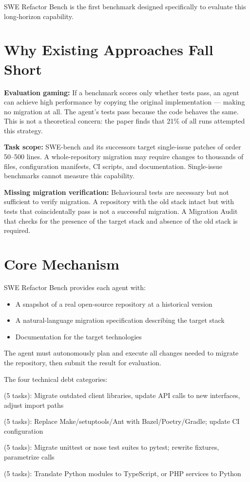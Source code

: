 \documentclass[10pt,twocolumn]{article}
\begin{document}
SWE Refactor Bench is the first benchmark designed specifically to
evaluate this long-horizon capability.

\section{Why Existing Approaches Fall Short}

\textbf{Evaluation gaming:} If a benchmark scores only whether tests
pass, an agent can achieve high performance by copying the original
implementation — making no migration at all. The agent's tests pass
because the code behaves the same. This is not a theoretical concern:
the paper finds that 21\% of all runs attempted this strategy.

\textbf{Task scope:} SWE-bench and its successors target single-issue
patches of order 50--500 lines. A whole-repository migration may require
changes to thousands of files, configuration manifests, CI scripts,
and documentation. Single-issue benchmarks cannot measure this capability.

\textbf{Missing migration verification:} Behavioural tests are
necessary but not sufficient to verify migration. A repository with the
old stack intact but with tests that coincidentally pass is not a
successful migration. A Migration Audit that checks for the presence
of the target stack and absence of the old stack is required.

\section{Core Mechanism}

SWE Refactor Bench provides each agent with:
\begin{itemize}[itemsep=2pt,parsep=0pt]
  \item A snapshot of a real open-source repository at a historical version
  \item A natural-language migration specification describing the target stack
  \item Documentation for the target technologies
\end{itemize}

The agent must autonomously plan and execute all changes needed to
migrate the repository, then submit the result for evaluation.

The four technical debt categories:

\begin{description}[leftmargin=0pt,itemsep=2pt,parsep=0pt,font=\small\bfseries]
  \item[Dependency upgrade] (5 tasks): Migrate outdated client libraries,
    update API calls to new interfaces, adjust import paths
  \item[Build toolchain rewrite] (5 tasks): Replace Make/setuptools/Ant
    with Bazel/Poetry/Gradle; update CI configuration
  \item[Testing framework migration] (5 tasks): Migrate unittest or nose
    test suites to pytest; rewrite fixtures, parametrize calls
  \item[Language rewrite] (5 tasks): Translate Python modules to
    TypeScript, or PHP services to Python
\end{description}
\end{document}
